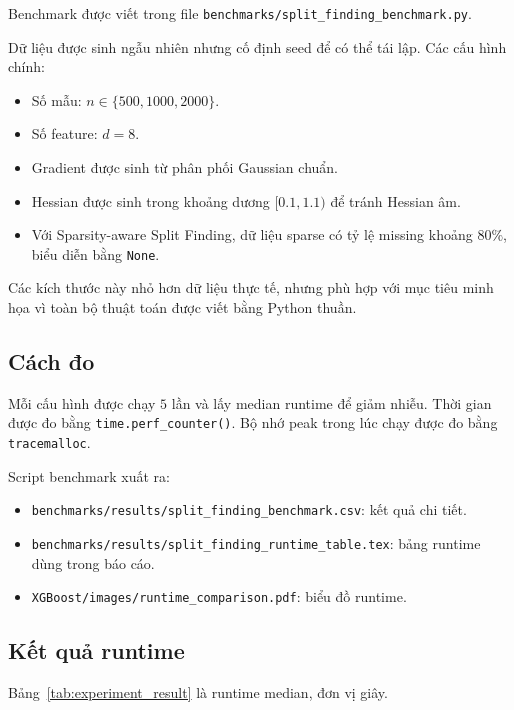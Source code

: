 Benchmark được viết trong file \texttt{benchmarks/split\_finding\_benchmark.py}.

Dữ liệu được sinh ngẫu nhiên nhưng cố định seed để có thể tái lập. Các cấu hình chính:

\begin{itemize}
    \item Số mẫu: $n \in \{500, 1000, 2000\}$.
    \item Số feature: $d = 8$.
    \item Gradient được sinh từ phân phối Gaussian chuẩn.
    \item Hessian được sinh trong khoảng dương $[0.1, 1.1)$ để tránh Hessian âm.
    \item Với Sparsity-aware Split Finding, dữ liệu sparse có tỷ lệ missing khoảng $80\%$, biểu diễn bằng \texttt{None}.
\end{itemize}

Các kích thước này nhỏ hơn dữ liệu thực tế, nhưng phù hợp với mục tiêu minh họa vì toàn bộ thuật toán được viết bằng Python thuần.

\subsection{Cách đo}

Mỗi cấu hình được chạy $5$ lần và lấy median runtime để giảm nhiễu. Thời gian được đo bằng \texttt{time.perf\_counter()}. Bộ nhớ peak trong lúc chạy được đo bằng \texttt{tracemalloc}.

Script benchmark xuất ra:

\begin{itemize}
    \item \texttt{benchmarks/results/split\_finding\_benchmark.csv}: kết quả chi tiết.
    \item \texttt{benchmarks/results/split\_finding\_runtime\_table.tex}: bảng runtime dùng trong báo cáo.
    \item \texttt{XGBoost/images/runtime\_comparison.pdf}: biểu đồ runtime.
\end{itemize}

\subsection{Kết quả runtime}

Bảng~\ref{tab:experiment_result} là runtime median, đơn vị giây.

\begin{table}[htbp]
    \centering
    \caption{Runtime median của các thuật toán split finding Python}
    \label{tab:experiment_result}
    
\end{table}

